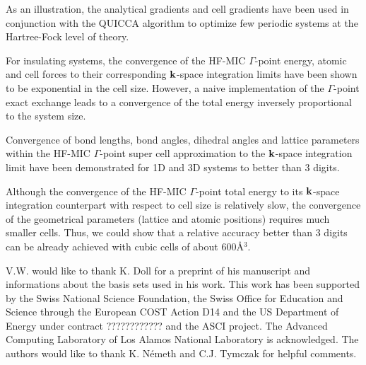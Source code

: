 \documentclass[prl,twocolumn,showpacs,twocolumngrid,superbib]{revtex4}
\begin{document}
As an illustration, the analytical gradients and cell gradients have been used 
in conjunction with the QUICCA algorithm to optimize few periodic systems at 
the Hartree-Fock level of theory. 

For insulating systems, the convergence of the HF-MIC $\Gamma$-point energy, 
atomic and cell forces to their corresponding 
${\bf k}$-space integration limits have been shown to be exponential 
in the cell size. 
However, a naive implementation of the $\Gamma$-point exact exchange leads to
a convergence of the total energy inversely proportional to the system size.


Convergence of bond lengths, bond angles, 
dihedral angles and lattice parameters within the HF-MIC $\Gamma$-point
super cell approximation to the ${\bf k}$-space integration limit have
been demonstrated for 1D and 3D systems to better than 3 digits.

Although the convergence of the HF-MIC $\Gamma$-point total energy to 
its ${\bf k}$-space integration counterpart with respect to cell size is relatively slow,
the convergence of the geometrical parameters (lattice and atomic positions)
requires much smaller cells. Thus, we could show that a relative accuracy better
than 3 digits can be already achieved with cubic cells of about $600$\AA$^3$.
\\
\begin{acknowledgments}
 V.W. would like to thank K. Doll for a preprint of his manuscript and informations
 about the basis sets used in his work.
 This work has been supported by the Swiss National Science Foundation, 
 the Swiss Office for Education and Science through the European 
 COST Action D14 and the US Department of Energy 
 under contract ???????????? and the ASCI project.  
 The Advanced Computing Laboratory of Los 
 Alamos National Laboratory is acknowledged.
 The authors would like to thank K. N\'emeth and C.J. Tymczak 
 for helpful comments.
\end{acknowledgments}  

\end{document}
